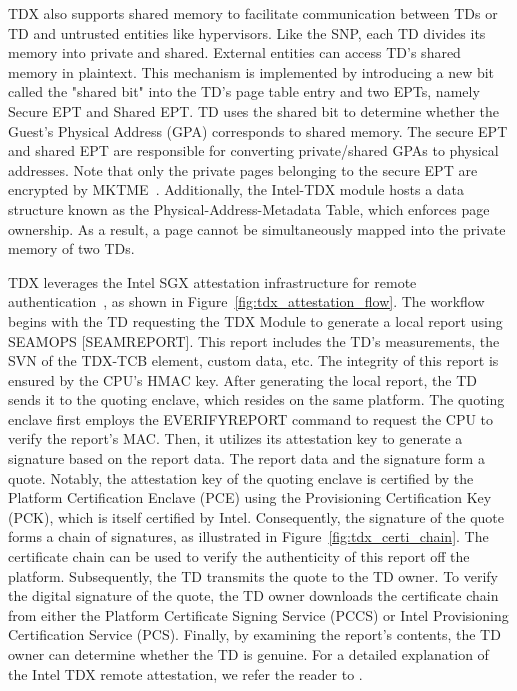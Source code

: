 TDX also supports shared memory to facilitate communication between TDs or TD and untrusted entities like hypervisors. Like the SNP, each TD divides its memory into private and shared. External entities can access TD's shared memory in plaintext. This mechanism is implemented by introducing a 
new bit called the "shared bit" into the TD's page table entry and two EPTs, namely Secure EPT and Shared EPT. TD uses the shared bit to determine whether the Guest's Physical Address (GPA) corresponds to shared memory. The secure EPT and shared EPT are responsible for converting private/shared 
GPAs to physical addresses. Note that only the private pages belonging to the secure EPT are encrypted by MKTME~\cite*{Intel_tdx_whitepaper}. Additionally, the Intel-TDX module hosts a data structure known as the Physical-Address-Metadata Table, which enforces page ownership. As a result, a page cannot be simultaneously 
mapped into the private memory of two TDs.


TDX leverages the Intel SGX attestation infrastructure for remote authentication~\cite*{Intel_tdx_whitepaper}, as shown in Figure~\ref{fig:tdx_attestation_flow}.
The workflow begins with the TD requesting the TDX Module to generate a local report using SEAMOPS [SEAMREPORT]. This report includes the TD's measurements, the SVN of the TDX-TCB element, custom data, etc. The integrity of this report is ensured by the CPU's HMAC key.
After generating the local report, the TD sends it to the quoting enclave,  which resides on the same platform. The quoting enclave first employs the EVERIFYREPORT command to request the CPU to verify the report's MAC. Then, it utilizes its attestation key to generate a signature based on the 
report data. The report data and the signature form a quote. Notably, the attestation key of the quoting enclave is certified by the Platform Certification Enclave (PCE) using the Provisioning Certification Key (PCK), which is itself certified by Intel.
Consequently, the signature of the quote forms a chain of signatures, as illustrated in Figure~\ref{fig:tdx_certi_chain}. The certificate chain can be used to verify the authenticity of this report off the platform. Subsequently, the TD transmits the quote to the TD owner. To verify the digital signature of the quote, 
the TD owner downloads the certificate chain from either the Platform Certificate Signing Service (PCCS) or Intel Provisioning Certification Service (PCS). Finally, by examining the report's contents, the TD owner can determine whether the TD is genuine.  For a detailed explanation of the Intel TDX remote attestation, we 
refer the reader to \cite*{Intel_tdx_whitepaper, 9448036, DBLP:journals/corr/abs-2303-15540}.

